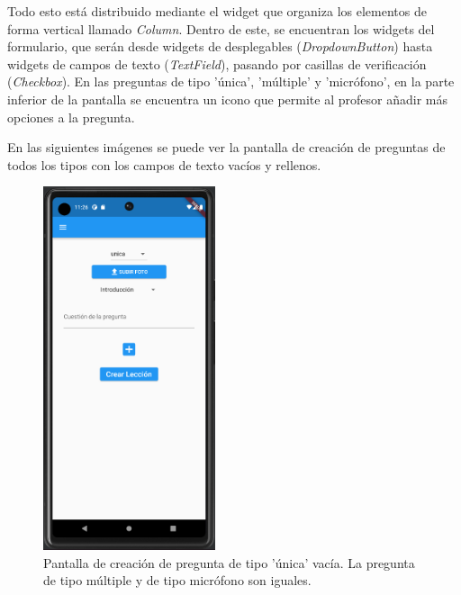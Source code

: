 \newpage
Todo esto está distribuido mediante el widget que organiza los elementos de forma vertical llamado \textit{Column}. Dentro de este, se encuentran los widgets del formulario, que serán desde widgets de desplegables (\textit{DropdownButton}) hasta widgets de campos de texto (\textit{TextField}), pasando por casillas de verificación (\textit{Checkbox}).
En las preguntas de tipo 'única', 'múltiple' y 'micrófono', en la parte inferior de la pantalla se encuentra un icono que permite al profesor añadir más opciones a la pregunta.

En las siguientes imágenes se puede ver la pantalla de creación de preguntas de todos los tipos con los campos de texto vacíos y rellenos.
\begin{figure}[H]
  \centering
  \includegraphics[width=0.45\textwidth]{imagenes/c7/crearpreguntaunica1.png}
  \caption{Pantalla de creación de pregunta de tipo 'única' vacía. La pregunta de tipo múltiple y de tipo micrófono son iguales.} 
  \label{fig:crearpreguntaunica}
\end{figure}


